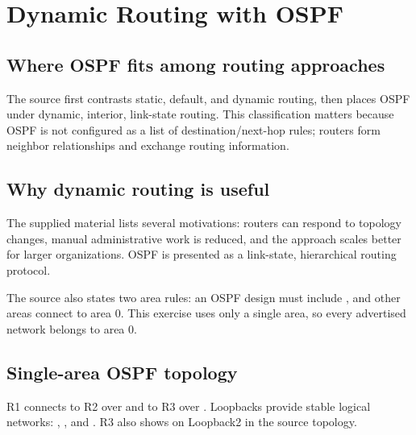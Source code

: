 \chapter{Dynamic Routing with OSPF}

\section{Where OSPF fits among routing approaches}
The source first contrasts static, default, and dynamic routing, then places OSPF under dynamic, interior, link-state routing. This classification matters because OSPF is not configured as a list of destination/next-hop rules; routers form neighbor relationships and exchange routing information.


\section{Why dynamic routing is useful}
The supplied material lists several motivations: routers can respond to topology changes, manual administrative work is reduced, and the approach scales better for larger organizations. OSPF is presented as a link-state, hierarchical routing protocol.

The source also states two area rules: an OSPF design must include , and other areas connect to area 0. This exercise uses only a single area, so every advertised network belongs to area 0.

\section{Single-area OSPF topology}
R1 connects to R2 over  and to R3 over . Loopbacks provide stable logical networks: , , and . R3 also shows  on Loopback2 in the source topology.


